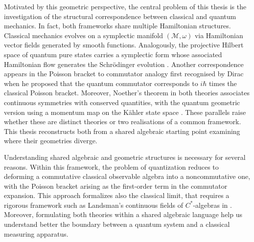 Motivated by this geometric perspective, the central problem of this thesis is the investigation of the structural correspondence between classical and quantum mechanics. In fact, both frameworks share multiple Hamiltonian structures. Classical mechanics evolves on a symplectic manifold $(\mathcal{M},\omega)$ via Hamiltonian vector fields generated by smooth functions. Analogously, the projective Hilbert space of quantum pure states carries a symplectic form whose associated Hamiltonian flow generates the Schr\"odinger evolution \cite{kibbleGeometrizationQuantumMechanics1979}. Another correspondence appears in the Poisson bracket to commutator analogy first recognised by Dirac when he proposed that the quantum commutator corresponds to $i \hbar$ times the classical Poisson bracket.  Moreover, Noether's theorem in both theories associates continuous symmetries with conserved quantities, with the quantum geometric version using a momentum map on the K\"ahler state space \cite{ashtekarGeometricalFormulationQuantum1997}. These parallels raise whether these are distinct theories or two realisations of a common framework. This thesis reconstructs both from a shared algebraic starting point examining where their geometries diverge.

Understanding shared algebraic and geometric structures is necessary for several reasons. Within this framework, the problem of quantization reduces to deforming a commutative classical observable algebra into a noncommutative one, with the Poisson bracket arising as the first-order term in the commutator expansion. This approach formalizes also the classical limit, that requires a rigorous framework such as Landsman's continuous fields of $C^*$-algebras in \cite{landsmanMathematicalTopicsClassical1998}. Moreover, formulating both theories within a shared algebraic language help us understand better the boundary between a quantum system and a classical measuring apparatus. 

